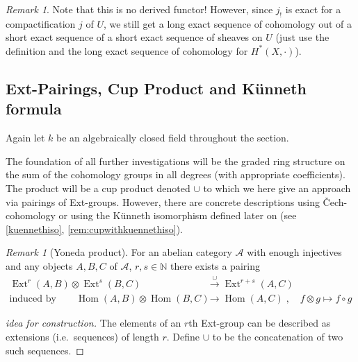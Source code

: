 \documentclass[english]{scrartcl}
\theoremstyle{definition}
\theoremstyle{remark}
\newtheorem{Rem}[Def]{Remark}
\newcommand*{\N}{\mathds{N}}
\DeclareMathOperator{\Ext}{Ext} %
\DeclareMathOperator{\Hom}{Hom} %
\newcommand*{\idest}{i.e.\ }
\begin{document}
\begin{Rem}
Note that this is no derived functor!
However, since $j_!$ is exact for a compactification $j$ of $U$, we
still get a long exact sequence of cohomology out of a short exact
sequence of a short exact sequence of sheaves on $U$
(just use the definition and the long exact sequence of cohomology for
$H^*(X,\cdot)$).
\end{Rem}

\subsection{Ext-Pairings, Cup Product and Künneth formula}
Again let $k$ be an algebraically closed field throughout the
section.

The foundation of all further investigations will be the graded
ring structure on the sum of the cohomology groups in all degrees
(with appropriate coefficients). The product will be a cup product
denoted $\cup$ to which we here give an approach via pairings of
Ext-groups. 
However, there are concrete descriptions using Čech-cohomology
\cite[see][Chap.~10 and Chap.~22, Cup-products]{milne}
or using the Künneth isomorphism defined later on (see
\autoref{kuennethiso}, \autoref{rem:cupwithkuennethiso}).

\begin{Rem}[Yoneda product]\label{yonedaproduct}
  For an abelian category $\mathcal{A}$ with enough injectives and
  any objects $A,B,C$ of $\mathcal{A}$, $r,s\in\N$ there exists a pairing
  \begin{align*}
    \Ext^r(A,B)\otimes\Ext^s(B,C) &\overset{\cup}{\longrightarrow}
    \Ext^{r+s}(A,C)
    \\
    \text{induced by}\qquad
    \Hom(A,B)\otimes\Hom(B,C) &\longrightarrow \Hom(A,C)\;,\quad
                                f\otimes g\mapsto f\circ g
  \end{align*}
  \begin{proof}[idea for construction]
    The elements of an $r$th Ext-group can be described as extensions
    (\idest sequences) of length $r$.
    Define $\cup$ to be the concatenation of two such sequences. 
  \end{proof}
\end{Rem}
\end{document}
